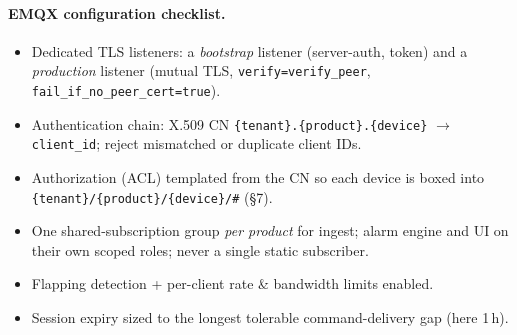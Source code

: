 \documentclass[11pt,a4paper]{article}
\begin{document}
\paragraph{EMQX configuration checklist.}
\begin{itemize}[leftmargin=1.4em,itemsep=1pt]
  \item Dedicated TLS listeners: a \emph{bootstrap} listener (server-auth, token) and a
        \emph{production} listener (mutual TLS, \texttt{verify=verify\_peer},
        \texttt{fail\_if\_no\_peer\_cert=true}).
  \item Authentication chain: X.509 CN \texttt{\{tenant\}.\{product\}.\{device\}}
        $\rightarrow$ \texttt{client\_id}; reject mismatched or duplicate client IDs.
  \item Authorization (ACL) templated from the CN so each device is boxed into
        \texttt{\{tenant\}/\allowbreak\{product\}/\allowbreak\{device\}/\#} (\S7).
  \item One shared-subscription group \emph{per product} for ingest; alarm engine and UI on
        their own scoped roles; never a single static subscriber.
  \item Flapping detection + per-client rate \& bandwidth limits enabled.
  \item Session expiry sized to the longest tolerable command-delivery gap (here 1\,h).
\end{itemize}
\end{document}
